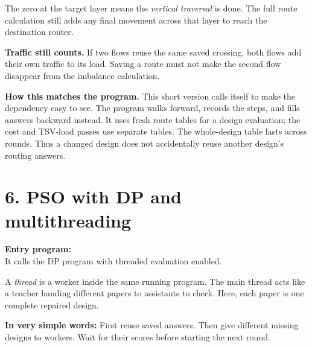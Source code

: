 \documentclass[11pt,a4paper]{article}
\newcommand{\simple}[1]{\textbf{In very simple words:} #1}
\begin{document}
The zero at the target layer means the \emph{vertical traversal} is done.
The full route calculation still adds any final movement across that layer
to reach the destination router.

\textbf{Traffic still counts.} If two flows reuse the same saved crossing,
both flows add their own traffic to its load. Saving a route must not make
the second flow disappear from the imbalance calculation.

\textbf{How this matches the program.} This short version calls itself to
make the dependency easy to see. The program walks forward, records the
steps, and fills answers backward instead. It uses fresh route tables for
a design evaluation; the cost and TSV-load passes use separate tables.
The whole-design table lasts across rounds. Thus a changed design does not
accidentally reuse another design's routing answers.

\clearpage
\section*{6. PSO with DP and multithreading}
\textbf{Entry program:} \\
It calls the DP program with threaded evaluation enabled.

A \emph{thread} is a worker inside the same running program. The main
thread acts like a teacher handing different papers to assistants to check.
Here, each paper is one complete repaired design.

\simple{First reuse saved answers. Then give different missing designs to
workers. Wait for their scores before starting the next round.}
\end{document}
